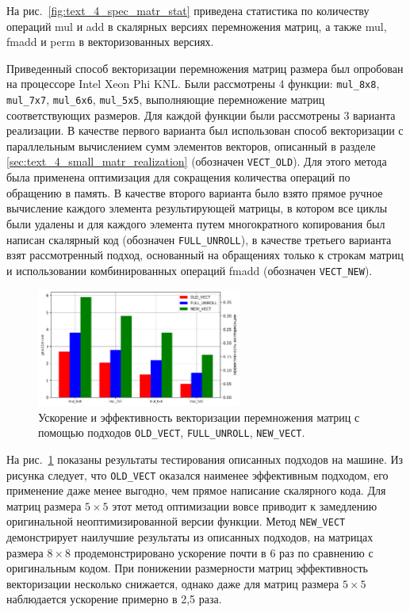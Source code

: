 На рис.~\ref{fig:text_4_spec_matr_stat} приведена статистика по количеству операций mul и add в скалярных версиях перемножения матриц, а также mul, fmadd и perm в векторизованных версиях.

Приведенный способ векторизации перемножения матриц размера был опробован на процессоре Intel Xeon Phi KNL.
Были рассмотрены 4 функции: \texttt{mul\_8x8}, \texttt{mul\_7x7}, \texttt{mul\_6x6}, \texttt{mul\_5x5}, выполняющие перемножение матриц соответствующих размеров.
Для каждой функции были рассмотрены 3 варианта реализации.
В качестве первого варианта был использован способ векторизации с параллельным вычислением сумм элементов векторов, описанный в разделе \ref{sec:text_4_small_matr_realization} (обозначен \texttt{VECT\_OLD}).
Для этого метода была применена оптимизация для сокращения количества операций по обращению в память.
В качестве второго варианта было взято прямое ручное вычисление каждого элемента результирующей матрицы, в котором все циклы были удалены и для каждого элемента путем многократного копирования был написан скалярный код (обозначен \texttt{FULL\_UNROLL}), в качестве третьего варианта взят рассмотренный подход, основанный на обращениях только к строкам матриц и использовании комбинированных операций fmadd (обозначен \texttt{VECT\_NEW}).

\begin{figure}[ht]
\centering
\includegraphics[width=0.6\textwidth]{./fig/vec_spec_matrices_res.png}
\singlespacing
{}\caption{Ускорение и эффективность векторизации перемножения матриц с помощью подходов \texttt{OLD\_VECT}, \texttt{FULL\_UNROLL}, \texttt{NEW\_VECT}.}
\label{fig:text_4_spec_matr_res}
\end{figure}

На рис.~\ref{fig:text_4_spec_matr_res} показаны результаты тестирования описанных подходов на машине.
Из рисунка следует, что \texttt{OLD\_VECT} оказался наименее эффективным подходом, его применение даже менее выгодно, чем прямое написание скалярного кода.
Для матриц размера $5 \times 5$ этот метод оптимизации вовсе приводит к замедлению оригинальной неоптимизированной версии функции.
Метод \texttt{NEW\_VECT} демонстрирует наилучшие результаты из описанных подходов, на матрицах размера $8 \times 8$ продемонстрировано ускорение почти в 6 раз по сравнению с оригинальным кодом.
При понижении размерности матриц эффективность векторизации несколько снижается, однако даже для матриц размера $5 \times 5$ наблюдается ускорение примерно в 2,5 раза.

